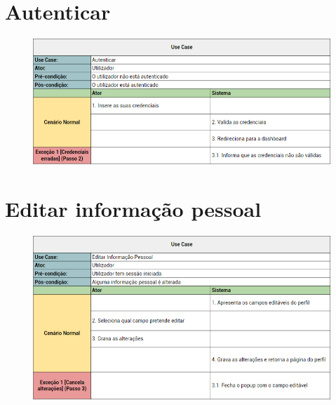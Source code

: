\documentclass[a4paper]{report}
\begin{document}
    \section{Autenticar}
        \begin{figure}[H]
        \centering
            \includegraphics[width=\textwidth]{images/usecases/autenticar.png}
        \end{figure}

    \section{Editar informação pessoal}
        \begin{figure}[H]
        \centering
            \includegraphics[width=\textwidth]{images/usecases/editar_utilizador.png}
        \end{figure}
\end{document}
